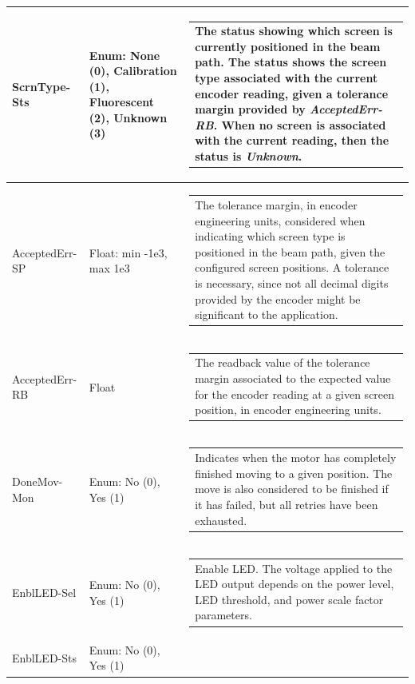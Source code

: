 \documentclass[openany]{article}
\begin{document}
\begin{longtable}{| m{4.5cm} m{2.5cm}  m{7.0cm} |}
        ScrnType-Sts & Enum: None (0), Calibration (1), Fluorescent (2), Unknown (3) & \begin{tabular}{@{}m{6cm}@{}}
                The status showing which screen is currently positioned in the beam path. The status shows the screen type associated with the current encoder reading, given a tolerance margin provided by \emph{AcceptedErr-RB}. When no screen is associated with the current reading, then the status is \emph{Unknown}.
            \end{tabular} \hypertarget{pv:accepted-err}{}\\ \hline
        AcceptedErr-SP & Float: min -1e3, max 1e3 & \begin{tabular}{@{}m{6cm}@{}}
                The tolerance margin, in encoder engineering units, considered when indicating which screen type is positioned in the beam path, given the configured screen positions. A tolerance is necessary, since not all decimal digits provided by the encoder might be significant to the application. 
            \end{tabular} \hypertarget{}{}\\ \hline
        AcceptedErr-RB & Float & \begin{tabular}{@{}m{6cm}@{}}
                The readback value of the tolerance margin associated to the expected value for the encoder reading at a given screen position, in encoder engineering units.
            \end{tabular} \hypertarget{pv:done-mov-mon}{}\\ \hline
        DoneMov-Mon & Enum: No (0), Yes (1) & \begin{tabular}{@{}m{6cm}@{}}
                Indicates when the motor has completely finished moving to a given position. The move is also considered to be finished if it has failed, but all retries have been exhausted.
            \end{tabular} \hypertarget{pv:enbl-led}{}\\ \hline
        EnblLED-Sel & Enum: No (0), Yes (1) & \begin{tabular}{@{}m{6cm}@{}}
                Enable LED. The voltage applied to the LED output depends on the power level, LED threshold, and power scale factor parameters.
            \end{tabular} \hypertarget{}{}\\ \hline
        EnblLED-Sts & Enum: No (0), Yes (1) & \begin{tabular}{@{}m{6cm}@{}}

\end{tabular}
\end{longtable}
\end{document}
